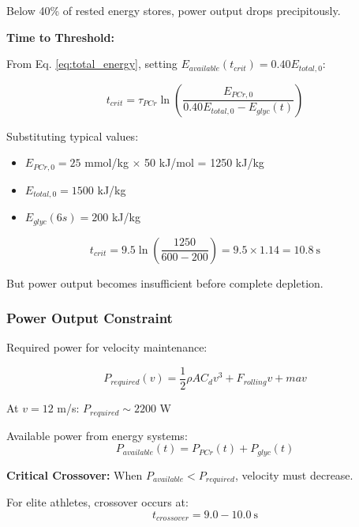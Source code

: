 Below 40\% of rested energy stores, power output drops precipitously.

\textbf{Time to Threshold:}

From Eq. \ref{eq:total_energy}, setting $E_{available}(t_{crit}) = 0.40 E_{total,0}$:

\begin{equation}
t_{crit} = \tau_{PCr} \ln\left(\frac{E_{PCr,0}}{0.40 E_{total,0} - E_{glyc}(t)}\right)
\label{eq:critical_time_energy}
\end{equation}

Substituting typical values:
\begin{itemize}
\item $E_{PCr,0} = 25$ mmol/kg $\times$ 50 kJ/mol = 1250 kJ/kg
\item $E_{total,0} = 1500$ kJ/kg
\item $E_{glyc}(6s) = 200$ kJ/kg
\end{itemize}

\begin{equation}
t_{crit} = 9.5 \ln\left(\frac{1250}{600 - 200}\right) = 9.5 \times 1.14 = \boxed{10.8~\text{s}}
\end{equation}

But power output becomes insufficient before complete depletion.

\subsubsection{Power Output Constraint}

Required power for velocity maintenance:

\begin{equation}
P_{required}(v) = \frac{1}{2} \rho A C_d v^3 + F_{rolling} v + m a v
\label{eq:power_required}
\end{equation}

At $v = 12$ m/s: $P_{required} \sim 2200$ W

Available power from energy systems:
\begin{equation}
P_{available}(t) = P_{PCr}(t) + P_{glyc}(t)
\label{eq:power_systems}
\end{equation}

\textbf{Critical Crossover:} When $P_{available} < P_{required}$, velocity must decrease.

For elite athletes, crossover occurs at:
\begin{equation}
t_{crossover} = 9.0-10.0~\text{s}
\label{eq:crossover_time}
\end{equation}

